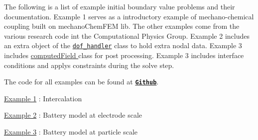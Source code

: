 The following is a list of example initial boundary value problems and their documentation. Example 1 serves as a introductory example of mechano-\/chemical coupling built on mechano\-Chem\-F\-E\-M lib. The other examples come from the various research code int the Computational Physics Group. Example 2 includes an extra object of the \href{https://www.dealii.org/8.5.0/doxygen/deal.II/classDoFHandler.html}{\tt dof\-\_\-handler} class to hold extra nodal data. Example 3 includes \hyperlink{}{computed\-Field } class for post processing. Example 3 includes interface conditions and applys constraints during the solve step.

The code for all examples can be found at \href{https://github.com/mechanoChem/mechanoChemFEM/tree/example}{\tt {\bfseries Github}}.

\hyperlink{_intercalation}{Example 1} \-: Intercalation \par
 \hyperlink{battery_electrode_scale}{Example 2} \-: Battery model at electrode scale\par
 \hyperlink{battery_particle}{Example 3} \-: Battery model at particle scale\par

